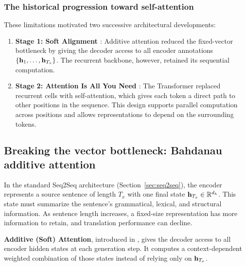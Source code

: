 \documentclass[../../main.tex]{subfiles}
\begin{document}
\subsubsection{The historical progression toward self-attention}
These limitations motivated two successive architectural developments:
\begin{enumerate}
    \item \textbf{Stage 1: Soft Alignment \cite{bahdanau2014}}: Additive attention reduced the fixed-vector bottleneck by giving the decoder access to all encoder annotations $\{\mathbf{h}_1, \dots, \mathbf{h}_{T_x}\}$. The recurrent backbone, however, retained its sequential computation.
    \item \textbf{Stage 2: Attention Is All You Need \cite{vaswani2017}}: The Transformer replaced recurrent cells with self-attention, which gives each token a direct path to other positions in the sequence. This design supports parallel computation across positions and allows representations to depend on the surrounding tokens.
\end{enumerate}

\subsection{Breaking the vector bottleneck: Bahdanau additive attention}
\label{sec:bahdanau_attention}

In the standard Seq2Seq architecture (Section~\ref{sec:seq2seq}), the encoder represents a source sentence of length $T_x$ with one final state $\mathbf{h}_{T_x} \in \mathbb{R}^{d_h}$. This state must summarize the sentence's grammatical, lexical, and structural information. As sentence length increases, a fixed-size representation has more information to retain, and translation performance can decline.

\textbf{Additive (Soft) Attention}, introduced in \cite{bahdanau2014}, gives the decoder access to all encoder hidden states at each generation step. It computes a context-dependent weighted combination of those states instead of relying only on $\mathbf{h}_{T_x}$.
\end{document}
